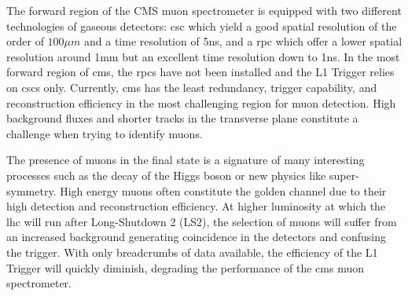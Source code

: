 The forward region of the CMS muon spectrometer is equipped with two different technologies of gaseous detectors: {csc} which yield a good spatial resolution of the order of $100\mu m$ and a time resolution of 5ns, and a {rpc} which offer a lower spatial resolution around 1mm but an excellent time resolution down to 1ns. In the most forward region of {cms}, the {rpc}s have not been installed and the L1 Trigger relies on {csc}s only. Currently, {cms} has the least redundancy, trigger capability, and reconstruction efficiency in the most challenging region for muon detection. High background fluxes and shorter tracks in the transverse plane constitute a challenge when trying to identify muons.

The presence of muons in the final state is a signature of many interesting processes such as the decay of the Higgs boson or new physics like super-symmetry. High energy muons often constitute the golden channel due to their high detection and reconstruction efficiency. At higher luminosity at which the {lhc} will run after Long-Shutdown 2 (LS2), the selection of muons will suffer from an increased background generating coincidence in the detectors and confusing the trigger. With only breadcrumbs of data available, the efficiency of the L1 Trigger will quickly diminish, degrading the performance of the {cms} muon spectrometer.

